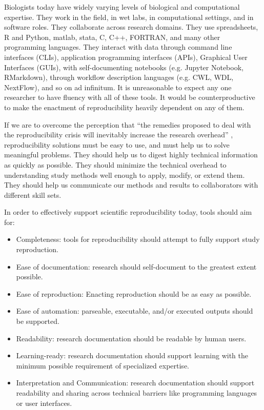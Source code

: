 Biologists today have widely varying levels of biological and computational
expertise. They work in the field, in wet labs, in computational settings, and
in software roles. They collaborate across research domains. They use
spreadsheets, R and Python, matlab, stata, C, C++, FORTRAN, and many other
programming languages. They interact with data through command line interfaces
(CLIs), application programming interfaces (APIs), Graphical User Interfaces
(GUIs), with self-documenting notebooks (e.g. Jupyter Notebook, RMarkdown),
through workflow description languages (e.g. CWL, WDL, NextFlow), and so on ad
infinitum. It is unreasonable to expect any one researcher to have fluency with
all of these tools. It would be counterproductive to make the enactment of
reproducibility heavily dependent on any of them.

If we are to overcome the perception that “the remedies proposed to deal with
the reproducibility crisis will inevitably increase the research overhead” \parencite[2634]{shiffrin_scientific_2018},
reproducibility solutions must be easy to use, and must help us to solve
meaningful problems. They should help us to digest highly technical information
as quickly as possible. They should minimize the technical overhead to
understanding study methods well enough to apply, modify, or extend them. They
should help us communicate our methods and results to collaborators with
different skill sets.

In order to effectively support scientific reproducibility today, tools should
aim for:
\begin{itemize}
    \item Completeness: tools for reproducibility should attempt to fully support study reproduction.
    \item Ease of documentation: research should self-document to the greatest extent possible.
    \item Ease of reproduction: Enacting reproduction should be as easy as possible.
    \item Ease of automation: parseable, executable, and/or executed outputs should be supported.
    \item Readability: research documentation should be readable by human users.
    \item Learning-ready: research documentation should support learning with
        the minimum possible requirement of specialized expertise.
    \item Interpretation and Communication: research documentation should
        support readability and sharing across technical barriers like programming
        languages or user interfaces.
\end{itemize}


